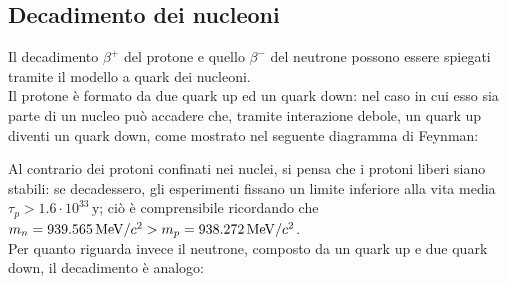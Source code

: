 \subsection{Decadimento dei nucleoni}

Il decadimento $ \beta^+ $ del protone e quello $ \beta^- $ del neutrone possono essere spiegati tramite il modello a quark dei nucleoni.\\
Il protone è formato da due quark up ed un quark down: nel caso in cui esso sia parte di un nucleo può accadere che, tramite interazione debole, un quark up diventi un quark down, come mostrato nel seguente diagramma di Feynman:

\begin{figure}[h!]
	\centering
{}
\end{figure}

Al contrario dei protoni confinati nei nuclei, si pensa che i protoni liberi siano stabili: se decadessero, gli esperimenti fissano un limite inferiore alla vita media $ \tau_p > 1.6 \cdot 10^{33} \,\text{y} $; ciò è comprensibile ricordando che $ m_n = 939.565 \,\mathrm{MeV}/c^2 > m_p = 938.272 \,\mathrm{MeV}/c^2 $.\\
Per quanto riguarda invece il neutrone, composto da un quark up e due quark down, il decadimento è analogo:

